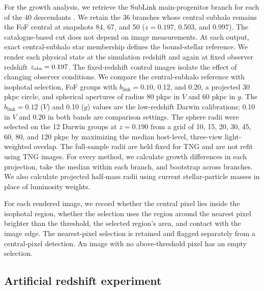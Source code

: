 \documentclass[usenatbib]{mnras}
\begin{document}
For the growth analysis, we retrieve the SubLink main-progenitor branch
for each of the 40 descendants \citep{rodriguezgomez2015}. We retain the
36 branches whose central subhalo remains the FoF central at snapshots
84, 67, and 50 ($z=0.197$, 0.503, and 0.997). The catalogue-based cut
does not depend on image measurements. At each output, exact central-subhalo star
membership defines the bound-stellar reference. We render each physical
state at the simulation redshift and again at fixed observer redshift
$z_{\rm obs}=0.197$. The fixed-redshift control images isolate the
effect of changing observer conditions. We compare the
central-subhalo reference with isophotal selection, FoF groups with
$b_{\mathrm{link}}=0.10$, 0.12, and 0.20, a projected 30 pkpc circle, and
spherical apertures of radius 80 pkpc in $V$ and 60 pkpc in $g$. The
$b_{\mathrm{link}}=0.12$ ($V$) and 0.10 ($g$) values are the low-redshift
Darwin calibrations; 0.10 in $V$ and 0.20 in both bands are comparison
settings. The sphere radii were selected on the 12 Darwin groups at
$z=0.190$ from a grid of 10, 15, 20, 30, 45, 60, 80, and 120 pkpc by
maximizing the median host-level, three-view light-weighted overlap. The
full-sample radii are held fixed for TNG and are not refit using TNG
images. For every method, we calculate growth differences in each
projection, take the median within each branch, and bootstrap across
branches. We also calculate projected half-mass radii using current
stellar-particle masses in place of luminosity weights.

For each rendered image, we record whether the central pixel lies inside
the isophotal region, whether the selection uses the region around the
nearest pixel brighter than the threshold, the selected region's area,
and contact with the image edge. The nearest-pixel selection is
retained and flagged separately from a central-pixel detection. An image
with no above-threshold pixel has an empty selection.

\subsection{Artificial redshift experiment}
\label{sec:artificialredshift}
\end{document}
